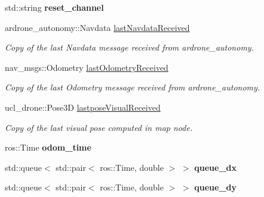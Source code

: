 \begin{DoxyCompactItemize}
\item 
\mbox{\label{classPoseEstimator_a54e1e130e05eb405b8beb805ca44d913}} 
std\+::string {\bfseries reset\+\_\+channel}
\item 
\mbox{\label{classPoseEstimator_a293224ff63dc5d962014cae5115ea938}} 
ardrone\+\_\+autonomy\+::\+Navdata \hyperlink{classPoseEstimator_a293224ff63dc5d962014cae5115ea938}{last\+Navdata\+Received}
\begin{DoxyCompactList}\small\item\em Copy of the last Navdata message received from ardrone\+\_\+autonomy. \end{DoxyCompactList}\item 
\mbox{\label{classPoseEstimator_aca1cc1090a68a47373bfa825b67cc3fe}} 
nav\+\_\+msgs\+::\+Odometry \hyperlink{classPoseEstimator_aca1cc1090a68a47373bfa825b67cc3fe}{last\+Odometry\+Received}
\begin{DoxyCompactList}\small\item\em Copy of the last Odometry message received from ardrone\+\_\+autonomy. \end{DoxyCompactList}\item 
\mbox{\label{classPoseEstimator_a465171e028c8f657cfcdf67ba99116af}} 
ucl\+\_\+drone\+::\+Pose3D \hyperlink{classPoseEstimator_a465171e028c8f657cfcdf67ba99116af}{lastpose\+Visual\+Received}
\begin{DoxyCompactList}\small\item\em Copy of the last visual pose computed in map node. \end{DoxyCompactList}\item 
\mbox{\label{classPoseEstimator_aaa66951498ad2123f33f045b52092c99}} 
ros\+::\+Time {\bfseries odom\+\_\+time}
\item 
\mbox{\label{classPoseEstimator_a22e1a70281ee753a9cc5eef7724891a0}} 
std\+::queue$<$ std\+::pair$<$ ros\+::\+Time, double $>$ $>$ {\bfseries queue\+\_\+dx}
\item 
\mbox{\label{classPoseEstimator_ad2bb985c658924f32839e982d892a64b}} 
std\+::queue$<$ std\+::pair$<$ ros\+::\+Time, double $>$ $>$ {\bfseries queue\+\_\+dy}

\end{DoxyCompactItemize}
